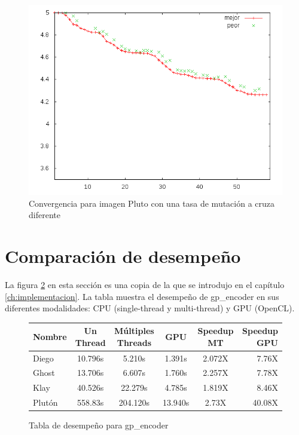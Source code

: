 \begin{figure}
    \includegraphics[width=1.0\textwidth]{plot_pluto_tweak}
    \caption{Convergencia para imagen Pluto con una tasa de mutación a cruza diferente}
    \label{img:plot-pluto2}
\end{figure}

\section{Comparación de desempeño}

La figura \ref{fig:perf_table} en esta sección es una copia de la que se
introdujo en el capítulo \ref{ch:implementacion}. La tabla muestra el desempeño
de gp\_encoder en sus diferentes modalidades: CPU (single-thread y multi-thread)
y GPU (OpenCL).

\begin{figure}[h]
    \begin{tabular}{ |l c c c c r| }
        \hline
        Nombre &  Un Thread & Múltiples Threads & GPU & Speedup MT & Speedup GPU \\
        \hline
        Diego & 10.796s & 5.210s & 1.391s  & 2.072X & 7.76X \\
        Ghost & 13.706s & 6.607s & 1.760s  & 2.257X & 7.78X \\
        Klay & 40.526s & 22.279s & 4.785s  & 1.819X & 8.46X \\%
        Plutón & 558.83s & 204.120s & 13.940s & 2.73X & 40.08X \\ %
        \hline
    \end{tabular}
    \caption{Tabla de desempeño para gp\_encoder}
    \label{fig:perf_table}
\end{figure}



